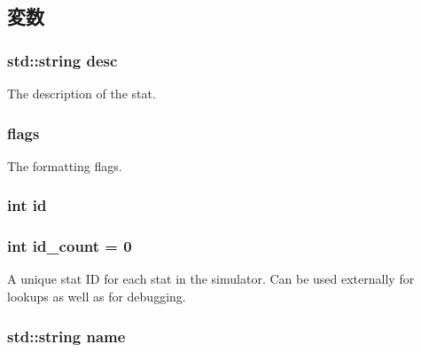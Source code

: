 \subsection{変数}
\hypertarget{classStats_1_1Info_a378e4473b8cd1fccf534804887f2bc85}{
\subsubsection[{desc}]{\setlength{\rightskip}{0pt plus 5cm}std::string {\bf desc}}}
\label{classStats_1_1Info_a378e4473b8cd1fccf534804887f2bc85}
The description of the stat. \hypertarget{classStats_1_1Info_aa991e2b209ef26272bf4fd920777bcda}{
\subsubsection[{flags}]{ {\bf flags}}}
\label{classStats_1_1Info_aa991e2b209ef26272bf4fd920777bcda}
The formatting flags. \hypertarget{classStats_1_1Info_a7441ef0865bcb3db9b8064dd7375c1ea}{
\subsubsection[{id}]{\setlength{\rightskip}{0pt plus 5cm}int {\bf id}}}
\label{classStats_1_1Info_a7441ef0865bcb3db9b8064dd7375c1ea}
\hypertarget{classStats_1_1Info_a22288cef00c8db95e1c16a7e64cc0d73}{
\subsubsection[{id\_\-count}]{\setlength{\rightskip}{0pt plus 5cm}int {\bf id\_\-count} = 0}}
\label{classStats_1_1Info_a22288cef00c8db95e1c16a7e64cc0d73}
A unique stat ID for each stat in the simulator. Can be used externally for lookups as well as for debugging. \hypertarget{classStats_1_1Info_a9b45b3e13bd9167aab02e17e08916231}{
\subsubsection[{name}]{\setlength{\rightskip}{0pt plus 5cm}std::string {\bf name}}}
